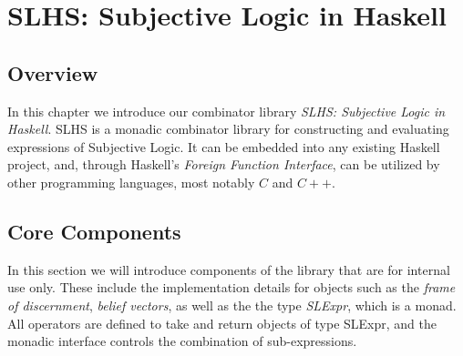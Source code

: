 \documentclass[thesis.tex]{subfiles}
\begin{document}
\chapter{SLHS: Subjective Logic in Haskell}
\label{chap:sl-in-haskell}


\section{Overview}

In this chapter we introduce our combinator library \emph{SLHS:
  Subjective Logic in Haskell}. SLHS is a monadic combinator library
for constructing and evaluating expressions of Subjective Logic. It
can be embedded into any existing Haskell project, and, through
Haskell's \emph{Foreign Function Interface}, can be utilized by other
programming languages, most notably $C$ and $C++$.


\section{Core Components}

In this section we will introduce components of the library that
are for internal use only. These include the implementation details
for objects such as the \emph{frame of discernment}, \emph{belief
  vectors}, as well as the the type \emph{SLExpr}, which is a monad.
All operators are defined to take and return objects of type
SLExpr, and the monadic interface controls the combination of
sub-expressions.








\end{document}
